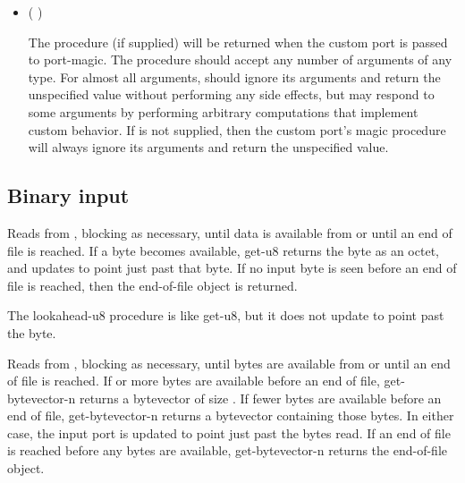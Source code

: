 \begin{entry}{%
}
\begin{itemize}
\item {\cf ( \dotsfoo{})}

  The  procedure (if supplied) will be returned
  when the custom port is passed to {\cf port-magic}.
  The  procedure should accept any number of arguments
  of any type.  For almost all arguments,  should
  ignore its arguments and return the unspecified value
  without performing any side effects, but 
  may respond to some arguments by performing arbitrary
  computations that implement custom behavior.
  If  is not supplied, then the custom port's
  magic procedure will always ignore its arguments and return
  the unspecified value.
\end{itemize}

\end{entry}

\subsection{Binary input}

\begin{entry}{%
}
   
Reads from , blocking as necessary, until data is
available from  or until an end of file is reached.
If a byte becomes available, {\cf get-u8} returns the byte as an octet, and
updates  to point just past that byte. If no input
byte is seen before an end of file is reached, then the end-of-file
object is returned.
\end{entry}

\begin{entry}{%
}
   
The {\cf lookahead-u8} procedure is like {\cf get-u8}, but it does not 
update  to point past the byte.
\end{entry}

\begin{entry}{%
}
   
Reads from , blocking as necessary, until 
bytes are available from  or until an end of file is
reached. If  or more bytes are available before an end
of file, {\cf get-bytevector-n} returns a bytevector of size .
If fewer bytes are available before an end of file, {\cf get-bytevector-n}
returns a bytevector
containing those bytes. In either case, the input port is updated to
point just past the bytes read.  If an end of file is reached before
any bytes are available, {\cf get-bytevector-n} returns the end-of-file object.
\end{entry}

